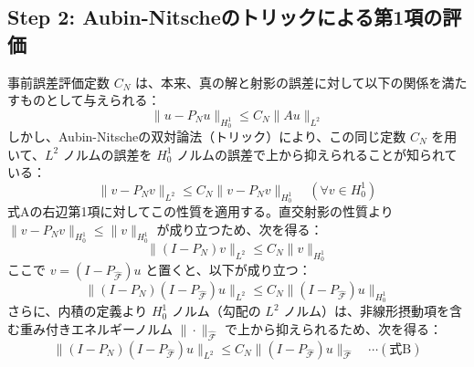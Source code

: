 \documentclass[a4paper, 11pt]{ltjsreport}
\theoremstyle{plain}
\theoremstyle{definition}
\begin{document}
\subsection*{Step 2: Aubin-Nitscheのトリックによる第1項の評価}
事前誤差評価定数 $C_N$ は、本来、真の解と射影の誤差に対して以下の関係を満たすものとして与えられる：
\begin{equation}
\|u - P_N u\|_{H_0^1} \le C_N \|Au\|_{L^2}
\end{equation}
しかし、Aubin-Nitscheの双対論法（トリック）により、この同じ定数 $C_N$ を用いて、$L^2$ ノルムの誤差を $H_0^1$ ノルムの誤差で上から抑えられることが知られている：
\begin{equation}
\|v - P_N v\|_{L^2} \le C_N \|v - P_N v\|_{H_0^1} \quad (\forall v \in H_0^1)
\end{equation}
式Aの右辺第1項に対してこの性質を適用する。直交射影の性質より $\|v - P_N v\|_{H_0^1} \le \|v\|_{H_0^1}$ が成り立つため、次を得る：
\begin{equation}
\|(I - P_N)v\|_{L^2} \le C_N \|v\|_{H_0^1}
\end{equation}
ここで $v = (I - P_{\hat{\mathcal{F}}})u$ と置くと、以下が成り立つ：
\begin{equation}
\|(I - P_N)(I - P_{\hat{\mathcal{F}}})u\|_{L^2} \le C_N \|(I - P_{\hat{\mathcal{F}}})u\|_{H_0^1}
\end{equation}
さらに、内積の定義より $H_0^1$ ノルム（勾配の $L^2$ ノルム）は、非線形摂動項を含む重み付きエネルギーノルム $\|\cdot\|_{\hat{\mathcal{F}}}$ で上から抑えられるため、次を得る：
\begin{equation}
\|(I - P_N)(I - P_{\hat{\mathcal{F}}})u\|_{L^2} \le C_N \|(I - P_{\hat{\mathcal{F}}})u\|_{\hat{\mathcal{F}}} \quad \cdots (\text{式B})
\end{equation}
\end{document}
